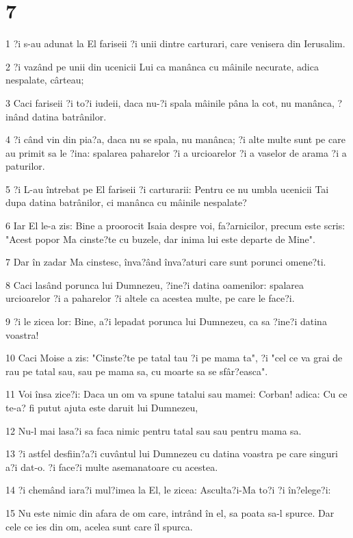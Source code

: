 \chapter{7}

\par 1 ?i s-au adunat la El fariseii ?i unii dintre carturari, care venisera din Ierusalim.
\par 2 ?i vazând pe unii din ucenicii Lui ca manânca cu mâinile necurate, adica nespalate, cârteau;
\par 3 Caci fariseii ?i to?i iudeii, daca nu-?i spala mâinile pâna la cot, nu manânca, ?inând datina batrânilor.
\par 4 ?i când vin din pia?a, daca nu se spala, nu manânca; ?i alte multe sunt pe care au primit sa le ?ina: spalarea paharelor ?i a urcioarelor ?i a vaselor de arama ?i a paturilor.
\par 5 ?i L-au întrebat pe El fariseii ?i carturarii: Pentru ce nu umbla ucenicii Tai dupa datina batrânilor, ci manânca cu mâinile nespalate?
\par 6 Iar El le-a zis: Bine a proorocit Isaia despre voi, fa?arnicilor, precum este scris: "Acest popor Ma cinste?te cu buzele, dar inima lui este departe de Mine".
\par 7 Dar în zadar Ma cinstesc, înva?ând înva?aturi care sunt porunci omene?ti.
\par 8 Caci lasând porunca lui Dumnezeu, ?ine?i datina oamenilor: spalarea urcioarelor ?i a paharelor ?i altele ca acestea multe, pe care le face?i.
\par 9 ?i le zicea lor: Bine, a?i lepadat porunca lui Dumnezeu, ca sa ?ine?i datina voastra!
\par 10 Caci Moise a zis: "Cinste?te pe tatal tau ?i pe mama ta", ?i "cel ce va grai de rau pe tatal sau, sau pe mama sa, cu moarte sa se sfâr?easca".
\par 11 Voi însa zice?i: Daca un om va spune tatalui sau mamei: Corban! adica: Cu ce te-a? fi putut ajuta este daruit lui Dumnezeu,
\par 12 Nu-l mai lasa?i sa faca nimic pentru tatal sau sau pentru mama sa.
\par 13 ?i astfel desfiin?a?i cuvântul lui Dumnezeu cu datina voastra pe care singuri a?i dat-o. ?i face?i multe asemanatoare cu acestea.
\par 14 ?i chemând iara?i mul?imea la El, le zicea: Asculta?i-Ma to?i ?i în?elege?i:
\par 15 Nu este nimic din afara de om care, intrând în el, sa poata sa-l spurce. Dar cele ce ies din om, acelea sunt care îl spurca.
